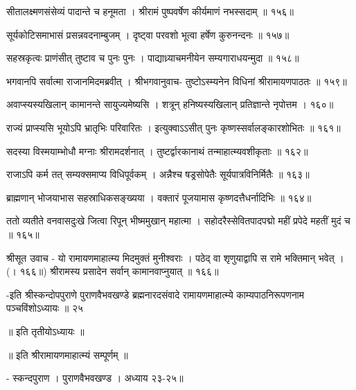 सीतालक्ष्मणसंसेव्यं पादान्ते च हनूमता ।
श्रीरामं पुष्पवर्षेण कीर्यमाणं नभस्सदाम् ॥ १५६॥

सूर्यकोटिसमाभासं प्रसन्नवदनाम्बुजम् ।
दृष्ट्वा परवशो भूत्वा हर्षेण कुरुनन्दनः ॥ १५७॥

सहस्रकृत्वः प्राणंसीत् तुष्टाव च पुनः पुनः ।
पाद्याध्र्याचमनीयेन सम्यगाराधयन्मुदा ॥ १५८॥

भगवानपि सर्वात्मा राजानमिदमब्रवीत् ।
श्रीभगवानुवाच-
तुष्टोऽस्म्यनेन विधिनां श्रीरामायणपाठतः ॥ १५९॥

अवाप्स्यस्यखिलान् कामानन्ते सायुज्यमेष्यसि ।
शत्रून् हनिष्यस्यखिलान् प्रतिज्ञान्ते नृपोत्तम । १६०॥

राज्यं प्राप्स्यसि भूयोऽपि भ्रातृभिः परिवारितः ।
इत्युक्वाऽऽसीत् पुनः कृष्णस्सर्वालङ्कारशोभितः ॥ १६१॥

सदस्या विस्मयाम्भोधौ मग्नाः श्रीरामदर्शनात् ।
तुष्टर्द्वारकानाथं तन्माहात्म्यवशीकृताः ॥ १६२॥

राजाऽपि कर्म तत् सम्यक्समाप्य विधिपूर्वकम् ।
अन्नैश्च षड्रसोपेतैः सूर्यपात्रविनिर्मितैः ॥ १६३॥

ब्राह्मणान् भोजयाभास सहस्राधिकसङ्ख्यया ।
वक्तारं पूजयामास कृष्णदत्तैधर्नादिभिः ॥ १६४॥

ततो व्यतीते वनवासदुःखे जित्वा रिपून् भीष्ममुखान् महात्मा ।
सहोदरैस्सेवितपादपद्मो महीं प्रपेदे महतीं मुदं च ॥ १६५॥

श्रीसूत उवाच -
यो रामायणमाहात्म्य मिदमुक्तं मुनीश्वराः ।
पठेद् वा श‍ृणुयाद्वापि स रामे भक्तिमान् भवेत् । (। १६६॥)
श्रीरामस्य प्रसादेन सर्वान् कामानवाप्नुयात् ॥ १६६॥

-इति श्रीस्कन्दोपपुराणे पुराणवैभवखण्डे ब्रह्मनारदसंवादे
रामायणमाहात्म्ये काम्यपाठनिरूपणनाम पञ्चविंशोऽध्यायः ॥ २५

॥ इति तृतीयोऽध्यायः ॥

॥ इति श्रीरामायणमाहात्म्यं सम्पूर्णम् ॥

- स्कन्दपुराण । पुराणवैभवखण्ड । अध्याय २३-२५॥
